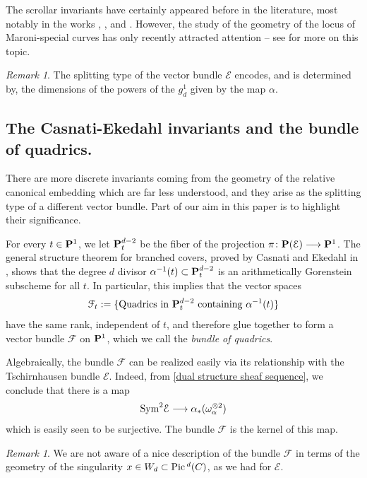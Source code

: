 \documentclass[reqno, 10 pt]{article}
\theoremstyle{definition}
\theoremstyle{remark}
\newtheorem{rmk}[thm]{Remark}
\numberwithin{equation}{section}
\numberwithin{thm}{section}
\numberwithin{prop}{section}
\numberwithin{lem}{section}
\numberwithin{cor}{section}
\numberwithin{conj}{section}
\numberwithin{defn}{section}
\renewcommand{\to}{\longrightarrow}
\newcommand{\cE}{{\mathcal E}}
\newcommand{\cF}{{\mathcal F}}
\renewcommand{\P}{{\bf P}}
\newcommand {\from}{{\colon}}
\newcommand {\Pic}{{\rm Pic}\,}
\newcommand {\Sym}{{\rm Sym}}
\begin{document}
The scrollar invariants have certainly appeared before in the literature, most notably in the works \cite{ballico-scrollar}, \cite{coppens_existence}, \cite{schreyer-scroll} and \cite{ohbuchi:relations}.  However, the study of the geometry of the locus of Maroni-special curves has only recently attracted attention -- see \cite{dp:pic_345} for more on this topic.

\begin{rmk}
The splitting type of the vector bundle $\cE$ encodes, and is determined by, the dimensions of the powers of the $g^{1}_{d}$ given by the map $\alpha$.
\end{rmk}

\subsection{The Casnati-Ekedahl invariants and the bundle of quadrics.}
There are more discrete invariants coming from the geometry of the relative canonical embedding which are far less understood, and they arise as the splitting type of a different vector bundle.  Part of our aim in this paper is to highlight their significance. 

For every $t \in \P^{1}$, we let $\P^{d-2}_{t}$ be the fiber of the projection $\pi \from \P(\cE) \to \P^{1}$.  The general structure theorem for branched covers, proved by Casnati and Ekedahl in \cite{casnati96:_cover_of_algeb_variet_i}, shows that the degree $d$ divisor $\alpha^{-1}(t) \subset \P^{d-2}_{t}$ is an arithmetically Gorenstein subscheme for all $t$.  In particular, this implies that the vector spaces $$\cF_{t} := \{\text{Quadrics in $\P^{d-2}_{t}$ containing $\alpha^{-1}(t)$}\}$$
have the same rank, independent of $t$, and therefore glue together to form a vector bundle $\cF$ on $\P^{1}$, which we call the {\sl bundle of quadrics}.  

Algebraically, the bundle $\cF$ can be realized easily via its relationship with the Tschirnhausen bundle $\cE$.  Indeed, from \ref{dual structure sheaf sequence}, we conclude that there is a map $$\Sym^{2}\cE \to \alpha_{*}(\omega_{\alpha}^{\otimes 2})$$ which is easily seen to be surjective. The bundle $\cF$ is the kernel of this map.

\begin{rmk}
We are not aware of a nice description of the bundle $\cF$ in terms of the geometry of the singularity $x \in W_{d} \subset \Pic^{d}(C)$, as we had for $\cE$.
\end{rmk}
\end{document}
